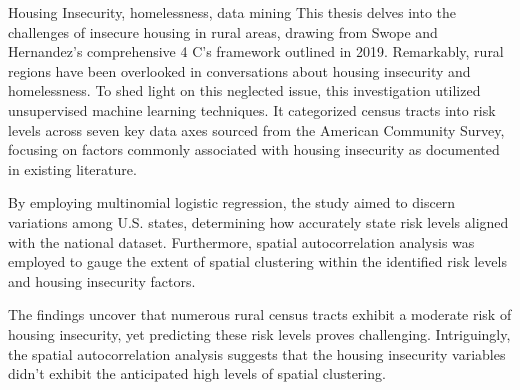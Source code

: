
\begin{abstract}
This thesis explores rural housing insecurity through Swope and Hernandez’s (2019) 4 C's of housing insecurity in rural areas. Little attention has been paid to rural areas in the conversation on housing insecurity and houselessness. To facilitate further discussion on this understudied issue, this exploratory study used unsupervised machine learning to group census tracts into risk levels across 7 axes of data from the American Community Survey. These were based on housing insecurity factors found in the literature. Multinomial logistic regression was used to determine variation between U.S. states based on how well state risk levels could be predicted with the national dataset. Furthermore, spatial autocorrelation analysis was employed to gauge the extent of spatial clustering within the identified risk levels and housing insecurity factors. The results indicate that many rural census tracts have a medium risk of housing insecurity, and the risk levels are hard to predict. The spatial autocorrelation results show that the housing insecurity variables were not as highly spatially clustered as expected.  
\end{abstract}

\begin{layabstract}{Housing Insecurity, homelessness, data mining}	%
This thesis delves into the challenges of insecure housing in rural areas, drawing from Swope and Hernandez's comprehensive 4 C's framework outlined in 2019. Remarkably, rural regions have been overlooked in conversations about housing insecurity and homelessness. To shed light on this neglected issue, this investigation utilized unsupervised machine learning techniques. It categorized census tracts into risk levels across seven key data axes sourced from the American Community Survey, focusing on factors commonly associated with housing insecurity as documented in existing literature.

By employing multinomial logistic regression, the study aimed to discern variations among U.S. states, determining how accurately state risk levels aligned with the national dataset. Furthermore, spatial autocorrelation analysis was employed to gauge the extent of spatial clustering within the identified risk levels and housing insecurity factors.

The findings uncover that numerous rural census tracts exhibit a moderate risk of housing insecurity, yet predicting these risk levels proves challenging. Intriguingly, the spatial autocorrelation analysis suggests that the housing insecurity variables didn't exhibit the anticipated high levels of spatial clustering.


\end{layabstract}

